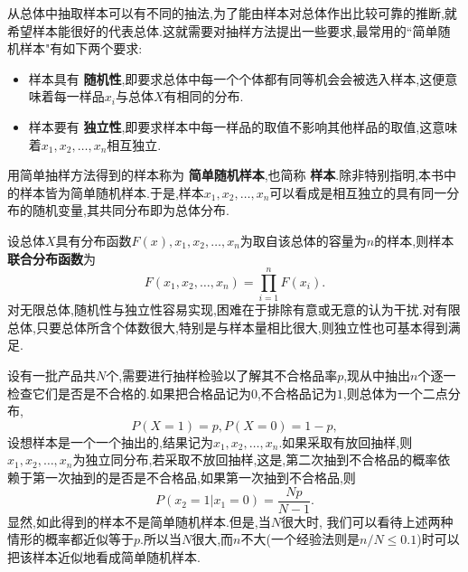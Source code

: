 从总体中抽取样本可以有不同的抽法,为了能由样本对总体作出比较可靠的推断,就希望样本能很好的代表总体.这就需要对抽样方法提出一些要求,最常用的``简单随机样本"有如下两个要求:
\begin{itemize}
\item 样本具有 \textbf{随机性},即要求总体中每一个个体都有同等机会会被选入样本,这便意味着每一样品$x_i$与总体$X$有相同的分布.
\item 样本要有 \textbf{独立性},即要求样本中每一样品的取值不影响其他样品的取值,这意味着$x_1,x_2,\dotsc,x_n$相互独立.
\end{itemize}

用简单抽样方法得到的样本称为 \textbf{简单随机样本},也简称 \textbf{样本}.除非特别指明,本书中的样本皆为简单随机样本.于是,样本$x_1,x_2,\dotsc,x_n$可以看成是相互独立的具有同一分布的随机变量,其共同分布即为总体分布.

设总体$X$具有分布函数$F(x),x_1,x_2,\dotsc,x_n$为取自该总体的容量为$n$的样本,则样本 \textbf{联合分布函数}为
\[F(x_1,x_2,\dotsc,x_n)=\prod_{i=1}^nF(x_i).\]
对无限总体,随机性与独立性容易实现,困难在于排除有意或无意的认为干扰.对有限总体,只要总体所含个体数很大,特别是与样本量相比很大,则独立性也可基本得到满足.
\begin{example}\label{exam:5.1.5}
设有一批产品共$N$个,需要进行抽样检验以了解其不合格品率$p$,现从中抽出$n$个逐一检查它们是否是不合格的.如果把合格品记为$0$,不合格品记为$1$,则总体为一个二点分布,
\[P(X=1)=p,P(X=0)=1-p,\]
设想样本是一个一个抽出的,结果记为$x_1,x_2,\dotsc,x_n$.如果采取有放回抽样,则$x_1,x_2,\dotsc,x_n$为独立同分布,若采取不放回抽样,这是,第二次抽到不合格品的概率依赖于第一次抽到的是否是不合格品,如果第一次抽到不合格品,则
\[P(x_2=1|x_1=0)=\frac{Np}{N-1}.\]
显然,如此得到的样本不是简单随机样本.但是,当$N$很大时, 我们可以看待上述两种情形的概率都近似等于$p$.所以当$N$很大,而$n$不大(一个经验法则是$n/N\leq0.1$)时可以把该样本近似地看成简单随机样本.
\end{example}

